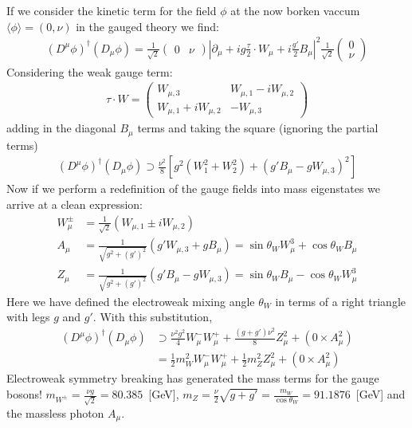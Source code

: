 If we consider the kinetic term for the field $\phi$ at the now borken vaccum $\langle \phi \rangle = (0 , \nu)$ in the gauged theory we find:
\begin{align*}
(D^\mu \phi)^\dagger (D_\mu \phi) = \frac{1}{\sqrt{2}} \left (\begin{array}{cc} 0  & \nu \end{array} \right )  \left | \partial_\mu + i g \frac{\tau}{2} \cdot W_\mu + i \frac{g'}{2} B_\mu \right|^2  \frac{1}{\sqrt{2}} \left (\begin{array}{c} 0 \\ \nu \end{array} \right ) 
\end{align*}
Considering the weak gauge term:
\begin{align*}
\tau \cdot W  = \left (\begin{array}{cc} W_{\mu,3} & W_{\mu,1} - i W_{\mu,2}  \\ W_{\mu,1}+ i W_{\mu,2} & - W_{\mu,3} \end{array} \right )
\end{align*}
adding in the diagonal $B_\mu$ terms and taking the square (ignoring the partial terms) 
\begin{align*}
(D^\mu \phi)^\dagger (D_\mu \phi) \supset \frac{\nu^2}{8} \left [g^2 (W_1^2 + W_2^2) + (g' B_\mu - g W_{\mu,3})^2 \right]
\end{align*}
Now if we perform a redefinition of the gauge fields into mass eigenstates we arrive at a clean expression:
\begin{align*}
W_{\mu}^{\pm} &= \frac{1}{\sqrt{2}}( W_{\mu,1}  \pm i W_{\mu,2} )  \\
A_{\mu} &= \frac{1}{\sqrt{g^2 + (g')^2}} (g' W_{\mu,3} + g B_\mu) = \sin \theta_W W^3_\mu + \cos \theta_W B_\mu \\
Z_{\mu} &= \frac{1}{\sqrt{g^2 + (g')^2}}( g' B_\mu - g W_{\mu,3}) = \sin \theta_W B_\mu - \cos \theta_W W_\mu^3 
\end{align*}
Here we have defined the electroweak mixing angle $\theta_W$ in terms of a right triangle with legs $g$ and $g'$. With this substitution,
\begin{align*}
(D^\mu \phi)^\dagger (D_\mu \phi) &\supset \frac{\nu^2 g^2}{4} W_{\mu}^{-} W_{\mu}^{+} + \frac{(g+g')\nu^2}{8} Z_\mu^2  + (0 \times A_\mu^2) \\ 
&= \frac{1}{2} m_{W}^2 W_\mu^- W_\mu^+ + \frac{1}{2} m_Z^2 Z_\mu^2  + (0 \times A_\mu^2)
\end{align*}
Electroweak symmetry breaking has generated the mass terms for the gauge bosons! 
$m_{W^{\pm}} = \frac{\nu g}{\sqrt{2}} = 80.385$~[GeV],
$m_Z = \frac{\nu}{2}\sqrt{g+g'} = \frac{m_W}{\cos \theta_W} = 91.1876$~[GeV]  and the massless photon $A_\mu$. 


